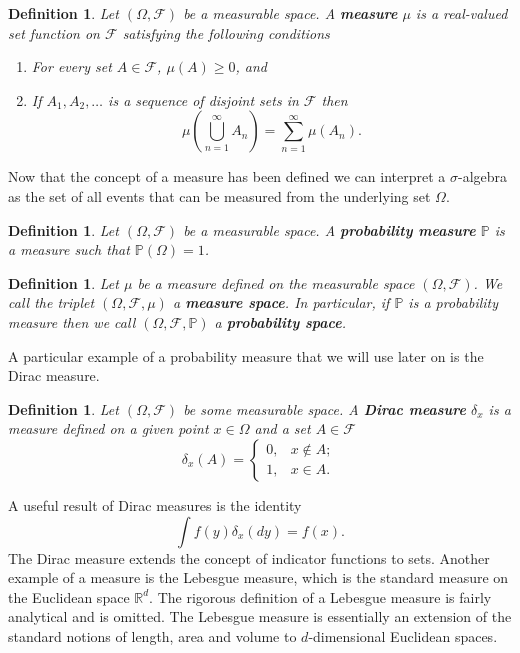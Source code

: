 \documentclass[honours,12pt]{unswthesis}
\newcommand{\R}{\mathbb{R}}
\newcommand{\PP}{\mathbb{P}}
\newcommand{\1}{\mathbf 1}
\newcommand{\FF}{\mathcal{F}}
\newtheorem{definition}[equation]{Definition}
\numberwithin{equation}{section}
\theoremstyle{definition}
\theoremstyle{remark}
\begin{document}
\begin{definition}
Let $(\Omega,\FF)$ be a measurable space. A \textbf{measure} $\mu$ is a real-valued set function on $\FF$ satisfying the following conditions
\begin{enumerate}
\item For every set $A\in \FF$, $\mu(A) \geq 0$, and
\item If $A_1, A_2,\ldots$ is a sequence of disjoint sets in $\FF$ then 
\[
\mu\left(\bigcup_{n=1}^\infty A_n\right) = \sum_{n=1}^\infty \mu(A_n).
\]
\end{enumerate}
\end{definition}
\noindent Now that the concept of a measure has been defined we can interpret a $\sigma$-algebra as the set of all events that can be measured from the underlying set $\Omega$.\\
\begin{definition}
Let $(\Omega,\FF)$ be a measurable space. A \textbf{probability measure} $\PP$ is a measure such that $\PP(\Omega) = 1$.\\
\end{definition}
\begin{definition}
Let $\mu$ be a measure defined on the measurable space $(\Omega,\FF)$. We call the triplet $(\Omega,\FF,\mu)$ a \textbf{measure space}. In particular, if $\PP$ is a probability measure then we call $(\Omega,\FF,\PP)$ a \textbf{probability space}.\\
\end{definition}

{\noindent}A particular example of a probability measure that we will use later on is the Dirac measure.\\
\begin{definition} Let $(\Omega, \FF)$ be some measurable space. A \textbf{Dirac measure} $\delta_x$ is a measure defined on a given point $x\in \Omega$ and a set $A\in \FF$ 
\[
\delta_x(A) = 
\begin{cases}
0, &x\notin A;\\
1, &x\in A.
\end{cases}
\]
\end{definition}
{\noindent}A useful result of Dirac measures is the identity
\[
\int f(y)\delta_x(dy) = f(x).
\]
The Dirac measure extends the concept of indicator functions to sets. Another example of a measure is the Lebesgue measure, which is the standard measure on the Euclidean space $\R^d$. The rigorous definition of a Lebesgue measure is fairly analytical and is omitted. The Lebesgue measure is essentially an extension of the standard notions of length, area and volume to $d$-dimensional Euclidean spaces.\\
\end{document}

